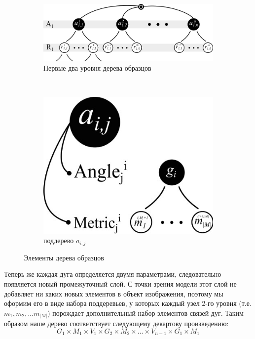 \begin{figure}[b]
	\centering
	\begin{subfigure}[b]{0.65\textwidth}
		\includegraphics[width=\textwidth,keepaspectratio]{images/metric_tree1}
		\caption{Первые два уровня дерева образцов}
	\end{subfigure}
	~
	\hfill
	\vline
	\hfill
	\begin{subfigure}[b]{0.25\textwidth}
		\includegraphics[width=\textwidth,keepaspectratio]{images/metric_subtree}
		\caption{поддерево $a_{i,j}$}
	\end{subfigure}
	\caption{Элементы дерева образцов}
\end{figure}

Теперь же каждая дуга определяется двумя параметрами, следовательно появляется новый промежуточный слой. С точки зрения модели этот слой не добавляет ни каких новых элементов в объект изображения, поэтому мы оформим его в виде набора поддеревьев, у которых каждый узел 2-го уровня (т.е. $m_1, m_2, ... m_{|M|}$) порождает дополнительный набор элементов связей дуг. Таким образом наше дерево соответствует следующему декартову произведению:
\begin{equation}
G_1 \times M_1 \times V_1 \times G_2 \times M_2 \times ... \times V_{n-1} \times G_1 \times M_1
\label{metric:decart}
\end{equation}
              
